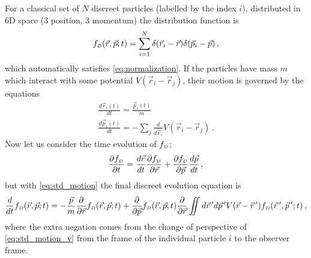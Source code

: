 For a classical set of $N$ discreet particles (labelled by the index $i$), distributed in 6D space (3 position, 3 momentum) the distribution function is 
\begin{equation}
  f_{{\scriptscriptstyle D}}(\vec{r}, \vec{p}; t) = 
  \sum\limits^{N}_{i=1} \delta(\vec{r}_{i} - \vec{r}) \delta(\vec{p}_{i} - \vec{p}) \,\text{,}
\end{equation}
which automatically satisfies \ref{eq:normalization}.
If the particles have mass $m$ which interact with some potential $V(\vec{r}_{i} - \vec{r}_{j})$, their motion is governed by the equations
\begin{subequations}\label{eq:std_motion}
\begin{gather}
  \frac{d\vec{r}_{i}(t)}{dt} = \frac{\vec{p}_{i}(t)}{m}\\
  \frac{d\vec{p}_{i}(t)}{dt} = -\sum\limits_{j} \frac{d}{d\vec{r}_{i}} V(\vec{r}_{i} - \vec{r}_{j}) \label{eq:std_motion_v} \,\text{.}
\end{gather}
\end{subequations}
Now let us consider the time evolution of $f_{{\scriptscriptstyle D}}$;
\begin{equation}
  \frac{\partial f_{{\scriptscriptstyle D}}}{\partial t} = 
  \frac{d\vec{r}}{dt} \frac{\partial f_{{\scriptscriptstyle D}}}{\partial \vec{r}} 
  + \frac{\partial f_{{\scriptscriptstyle D}}}{\partial \vec{p}} \frac{d\vec{p}}{dt} \,\text{,}
\end{equation}
but with \ref{eq:std_motion} the final discreet evolution equation is
\begin{equation} \label{eq:evolution_discreet}
  \frac{d}{dt} f_{{\scriptscriptstyle D}}(\vec{r}, \vec{p}; t) =
  -\frac{\vec{p}}{m} \frac{\partial}{\partial \vec{r}} f_{{\scriptscriptstyle D}}(\vec{r}, \vec{p}; t)
  + \frac{\partial}{\partial \vec{p}} f_{{\scriptscriptstyle D}} (\vec{r}, \vec{p}; t)
  \frac{\partial}{\partial \vec{r}} \iint d\vec{r}\,^{\prime} d\vec{p}\,^{\prime} V(\vec{r} - \vec{r}\,^{\prime}) f_{{\scriptscriptstyle D}}(\vec{r}\,^{\prime},\vec{p}\,^{\prime};t) \,\text{,}
\end{equation}
where the extra negation comes from the change of perspective of \ref{eq:std_motion_v} from the frame of the individual particle $i$ to the observer frame.

